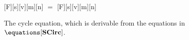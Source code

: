 \begin{figure}[t]
    \centering
    [F][s][v][m][n]
    \(=\)
    [F][s][v][m][n]
    \caption{
        The cycle equation, which is derivable from the equations in
        \(\equations[\mathbf{SCirc}]\).
    }
    \label{fig:cycle}
\end{figure}
